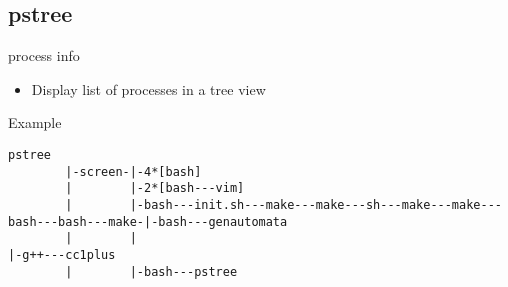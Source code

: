 \subsection{pstree}

\begin{frame}[fragile]{process info}
  \begin{itemize}
    \pause \item Display list of processes in a tree view
  \end{itemize}
  \pause

  \begin{exampleblock}{Example}
    \begin{lstlisting}[showstringspaces=false,basicstyle=\tiny]
pstree
        |-screen-|-4*[bash]
        |        |-2*[bash---vim]
        |        |-bash---init.sh---make---make---sh---make---make---bash---bash---make-|-bash---genautomata
        |        |                                                                      |-g++---cc1plus
        |        |-bash---pstree
    \end{lstlisting}
  \end{exampleblock}
\end{frame}
